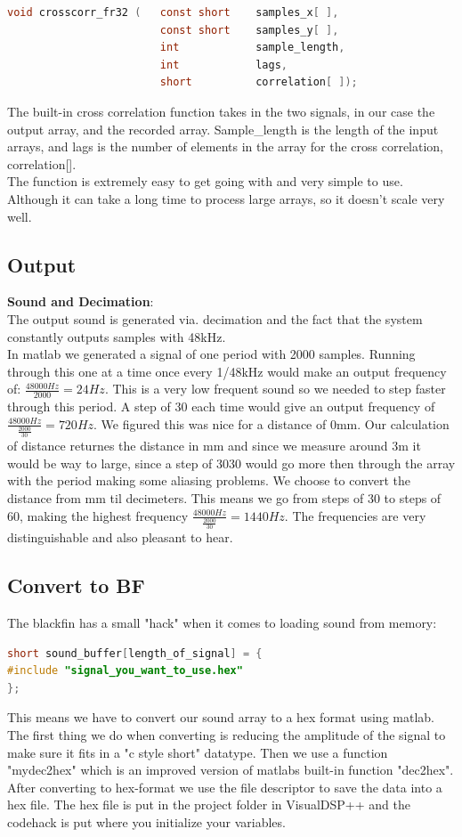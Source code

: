 \begin{lstlisting}[language=C]
void crosscorr_fr32 (	const short    samples_x[ ], 
                     	const short    samples_y[ ],
                     	int            sample_length,
                     	int            lags,
                     	short          correlation[ ]);
\end{lstlisting}
The built-in cross correlation function takes in the two signals, in our case the output array, and the recorded array. Sample\_length is the length of the input arrays, and lags is the number of elements in the array for the cross correlation, correlation[].\\
The function is extremely easy to get going with and very simple to use. Although it can take a long time to process large arrays, so it doesn't scale very well.\\
\subsection{Output}
\textbf{Sound and Decimation}:\\
The output sound is generated via. decimation and the fact that the system constantly outputs samples with 48kHz.\\
In matlab we generated a signal of one period with 2000 samples. Running through this one at a time once every 1/48kHz would make an output frequency of: $\frac{48000Hz}{2000}=24Hz$. This is a very low frequent sound so we needed to step faster through this period. A step of 30 each time would give an output frequency of $\frac{48000Hz}{\frac{2000}{30}}=720Hz$. We figured this was nice for a distance of 0mm. Our calculation of distance returnes the distance in mm and since we measure around 3m it would be way to large, since a step of 3030 would go more then through the array with the period making some aliasing problems. We choose to convert the distance from mm til decimeters. This means we go from steps of 30 to steps of 60, making the highest frequency $\frac{48000Hz}{\frac{2000}{30}}=1440Hz$. The frequencies are very distinguishable and also pleasant to hear.\\


\subsection{Convert to BF}
The blackfin has a small "hack" when it comes to loading sound from memory:
\begin{lstlisting}[language=C]
short sound_buffer[length_of_signal] = { 
#include "signal_you_want_to_use.hex"
};
\end{lstlisting}
This means we have to convert our sound array to a hex format using matlab. The first thing we do when converting is reducing the amplitude of the signal to make sure it fits in a "c style short" datatype. Then we use a function "mydec2hex" which is an improved version of matlabs built-in function "dec2hex". After converting to hex-format we use the file descriptor to save the data into a hex file. The hex file is put in the project folder in VisualDSP++ and the codehack is put where you initialize your variables.



